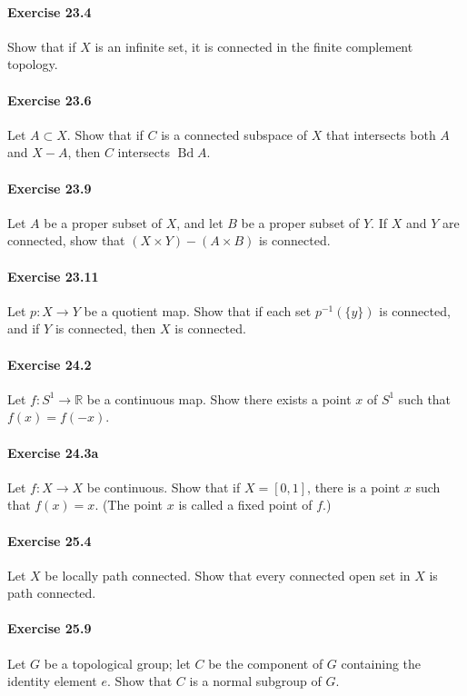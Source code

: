 \documentclass{article}
\begin{document}
\paragraph{Exercise 23.4} Show that if $X$ is an infinite set, it is connected in the finite complement topology.


\paragraph{Exercise 23.6} Let $A \subset X$. Show that if $C$ is a connected subspace of $X$ that intersects both $A$ and $X-A$, then $C$ intersects $\operatorname{Bd} A$.


\paragraph{Exercise 23.9} Let $A$ be a proper subset of $X$, and let $B$ be a proper subset of $Y$. If $X$ and $Y$ are connected, show that $(X \times Y)-(A \times B)$ is connected.


\paragraph{Exercise 23.11} Let $p: X \rightarrow Y$ be a quotient map. Show that if each set $p^{-1}(\{y\})$ is connected, and if $Y$ is connected, then $X$ is connected.


\paragraph{Exercise 24.2} Let $f: S^{1} \rightarrow \mathbb{R}$ be a continuous map. Show there exists a point $x$ of $S^{1}$ such that $f(x)=f(-x)$.


\paragraph{Exercise 24.3a} Let $f \colon X \rightarrow X$ be continuous. Show that if $X = [0, 1]$, there is a point $x$ such that $f(x) = x$. (The point $x$ is called a fixed point of $f$.)


\paragraph{Exercise 25.4} Let $X$ be locally path connected. Show that every connected open set in $X$ is path connected.


\paragraph{Exercise 25.9} Let $G$ be a topological group; let $C$ be the component of $G$ containing the identity element $e$. Show that $C$ is a normal subgroup of $G$.
\end{document}
